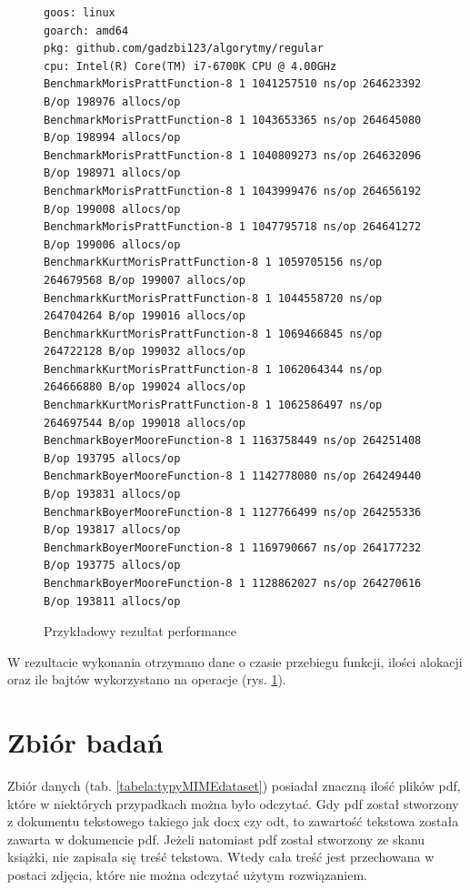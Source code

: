 \begin{figure}[h]
  \centering
  \begin{lstlisting}
goos: linux
goarch: amd64
pkg: github.com/gadzbi123/algorytmy/regular
cpu: Intel(R) Core(TM) i7-6700K CPU @ 4.00GHz
BenchmarkMorisPrattFunction-8 1	1041257510 ns/op 264623392 B/op 198976 allocs/op
BenchmarkMorisPrattFunction-8 1	1043653365 ns/op 264645080 B/op 198994 allocs/op
BenchmarkMorisPrattFunction-8 1	1040809273 ns/op 264632096 B/op 198971 allocs/op
BenchmarkMorisPrattFunction-8 1	1043999476 ns/op 264656192 B/op 199008 allocs/op
BenchmarkMorisPrattFunction-8 1	1047795718 ns/op 264641272 B/op 199006 allocs/op
BenchmarkKurtMorisPrattFunction-8 1	1059705156 ns/op 264679568 B/op 199007 allocs/op
BenchmarkKurtMorisPrattFunction-8 1	1044558720 ns/op 264704264 B/op 199016 allocs/op
BenchmarkKurtMorisPrattFunction-8 1	1069466845 ns/op 264722128 B/op 199032 allocs/op
BenchmarkKurtMorisPrattFunction-8 1	1062064344 ns/op 264666880 B/op 199024 allocs/op
BenchmarkKurtMorisPrattFunction-8 1	1062586497 ns/op 264697544 B/op 199018 allocs/op
BenchmarkBoyerMooreFunction-8 1	1163758449 ns/op 264251408 B/op 193795 allocs/op
BenchmarkBoyerMooreFunction-8 1	1142778080 ns/op 264249440 B/op 193831 allocs/op
BenchmarkBoyerMooreFunction-8 1	1127766499 ns/op 264255336 B/op 193817 allocs/op
BenchmarkBoyerMooreFunction-8 1	1169790667 ns/op 264177232 B/op 193775 allocs/op
BenchmarkBoyerMooreFunction-8 1	1128862027 ns/op 264270616 B/op 193811 allocs/op
  \end{lstlisting}
  \caption{Przykładowy rezultat performance}
  \label{fig:perfTestResults}
\end{figure}

W rezultacie wykonania otrzymano dane o czasie przebiegu funkcji, ilości 
alokacji oraz ile bajtów wykorzystano na operacje (rys. \ref{fig:perfTestResults}).

\section{Zbiór badań}

Zbiór danych (tab. \ref{tabela:typyMIMEdataset}) posiadał znaczną ilość 
plików pdf, które w niektórych przypadkach można było odczytać. Gdy pdf został
stworzony z dokumentu tekstowego takiego jak docx czy odt, to zawartość tekstowa
została zawarta w dokumencie pdf. Jeżeli natomiast pdf został stworzony ze skanu
książki, nie zapisała się treść tekstowa. Wtedy cała treść jest przechowana w 
postaci zdjęcia, które nie można odczytać użytym rozwiązaniem.

